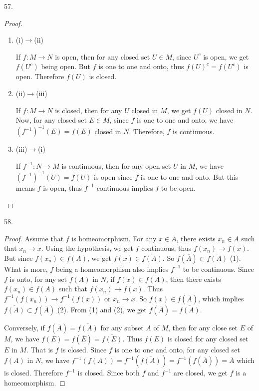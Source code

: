 \documentclass[12pt, a4paper]{article}
\theoremstyle{plain}
\begin{document}
57.
\begin{proof}
\hfill

\begin{enumerate}
\item(i)$\rightarrow$(ii)

If $f: M\rightarrow N$ is open, then for any closed set $U\in M$, since $U^c$ is open, we get $f(U^c)$ being open. But $f$ is one to one and onto, thus $f(U)^c=f(U^c)$ is open. Therefore $f(U)$ is closed. 

\item (ii)$\rightarrow$(iii)

If $f:M\rightarrow N$ is closed, then for any $U$ closed in $M$, we get $f(U)$ closed in $N$. Now, for any closed set $E\in M$, since $f$ is one to one and onto, we have $(f^{-1})^{-1}(E)=f(E)$ closed in $N$. Therefore, $f$ is continuous.

\item (iii)$\rightarrow$(i)

If $f^{-1}:N\rightarrow M$ is continuous, then for any open set $U$ in $M$, we have $(f^{-1})^{-1}(U)=f(U)$ is open since $f$ is one to one and onto. But this means $f$ is open, thus $f^{-1}$ continuous implies $f$ to be open.
\end{enumerate}
\end{proof}

\pagebreak

58. 
\begin{proof}
Assume that $f$ is homeomorphism. For any $x\in\overline{A}$, there exists $x_n\in A$ such that $x_n\rightarrow x$. Using the hypothesis, we get $f$ continuous, thus $f(x_n)\rightarrow f(x)$. But since $f(x_n)\in f(A)$, we get $f(x)\in \overline{f(A)}$. So $f(\overline{A})\subset \overline{f(A)}$ (1). What is more, $f$ being a homeomorphism also implies $f^{-1}$ to be continuous. Since $f$ is onto, for any set $f(A)$ in $N$, if $f(x)\in \overline{f(A)}$, then there exists $f(x_n)\in f(A)$ such that $f(x_n)\rightarrow f(x)$. Thus $f^{-1}(f(x_n))\rightarrow f^{-1}(f(x))$ or $x_n\rightarrow x$. So $f(x)\in f(\overline{A})$, which implies $\overline{f(A)}\subset f(\overline{A})$ (2). From (1) and (2), we get $f(\overline{A})=\overline{f(A)}$.

Conversely, if $f(\overline{A})=\overline{f(A)}$ for any subset $A$ of $M$, then for any close set $E$ of $M$, we have $f(E)=f(\overline{E})=\overline{f(E)}$. Thus $f(E)$ is closed for any closed set $E$ in $M$. That is $f$ is closed. Since $f$ is one to one and onto, for any closed set $f(A)$ in $N$, we have $f^{-1}(f(A))=f^{-1}(\overline{f(A)})=f^{-1}(f(\overline{A}))=\overline{A}$ which is closed. Therefore $f^{-1}$ is closed. Since both $f$ and $f^{-1}$ are closed, we get $f$ is a homeomorphism.
\end{proof}
\end{document}
